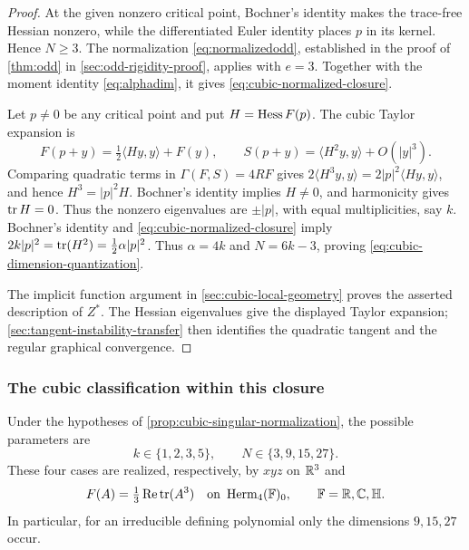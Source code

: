 \begin{proof}
At the given nonzero critical point, Bochner's identity makes
the trace-free Hessian nonzero, while the differentiated Euler
identity places \(p\) in its kernel. Hence \(N\geq3\).
The normalization \eqref{eq:normalizedodd}, established in the
proof of \cref{thm:odd} in \cref{sec:odd-rigidity-proof}, applies
with \(e=3\). Together with the moment identity
\eqref{eq:alphadim}, it gives \eqref{eq:cubic-normalized-closure}.

Let \(p\ne0\) be any critical point and put \(H=\operatorname{Hess} F(p)\).
The cubic Taylor expansion is
\[
 F(p+y)=\tfrac12\langle Hy,y\rangle+F(y),\qquad
 S(p+y)=\langle H^2y,y\rangle+O(|y|^3).
\]
Comparing quadratic terms in \(\Gamma(F,S)=4RF\) gives
\(2\langle H^3y,y\rangle=2|p|^2\langle Hy,y\rangle\),
and hence \(H^3=|p|^2H\). Bochner's identity implies \(H\ne0\),
and harmonicity gives \(\operatorname{tr} H=0\). Thus the nonzero eigenvalues
are \(\pm|p|\), with equal multiplicities, say \(k\).
Bochner's identity and \eqref{eq:cubic-normalized-closure} imply \(2k|p|^2=\operatorname{tr}(H^2)=\tfrac12\alpha|p|^2\).
Thus \(\alpha=4k\) and \(N=6k-3\), proving
\eqref{eq:cubic-dimension-quantization}.

The implicit function argument in \cref{sec:cubic-local-geometry}
proves the asserted description of \(Z^*\). The Hessian eigenvalues
give the displayed Taylor expansion; \cref{sec:tangent-instability-transfer}
then identifies the quadratic tangent and the regular graphical convergence.
\end{proof}

\subsubsection{The cubic classification within this closure}
\begin{proposition}
\label{prop:cubic-gradient-classification}
\label{rem:cubic-radial-eigencubic}
Under the hypotheses of \cref{prop:cubic-singular-normalization},
the possible parameters are
\begin{equation}\label{eq:cubic-realized-dimensions}
 k\in\{1,2,3,5\},\qquad N\in\{3,9,15,27\}.
\end{equation}
These four cases are realized, respectively, by \(xyz\) on \(\mathbb R^3\)
and
\[
 F(A)=\tfrac13\operatorname{Re}\operatorname{tr}(A^3)
 \quad\text{on }\operatorname{Herm}_4(\mathbb F)_0,
 \qquad \mathbb F=\mathbb R,\mathbb C,\mathbb H.
\]
In particular, for an irreducible defining polynomial only the
dimensions \(9,15,27\) occur.
\end{proposition}

